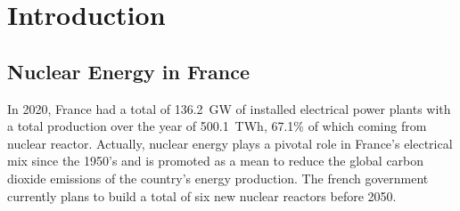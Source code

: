 
\chapter{Introduction} %

\label{ch:introduction} %




\minitoc

\section{Nuclear Energy in France}

In 2020, France had a total of 136.2~GW of installed electrical power plants with a total production over the year of 500.1~TWh, 67.1\% of which coming from nuclear reactor. Actually, nuclear energy plays a pivotal role in France's electrical mix since the 1950's and is promoted as a mean to reduce the global carbon dioxide emissions of the country's energy production. The french government currently plans to build a total of six new nuclear reactors before 2050.



%


